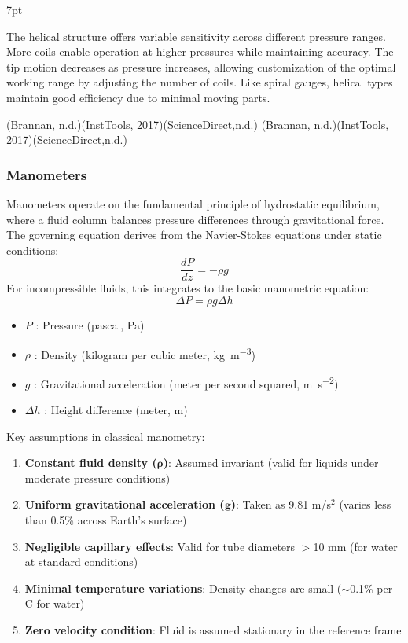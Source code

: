 \documentclass{article}
\newcommand{\formalsource}{} %
\newenvironment{formal}[3][]{%
	\renewcommand{\formalsource}{#1}%
	\def\FrameCommand{%
		\hspace{1pt}%
		{\color{#2}\vrule width 2pt}%
		{\color{#3}\vrule width 4pt}%
		\colorbox{#3}%
	}%
	\MakeFramed{\advance\hsize-\width\FrameRestore}%
	\noindent\hspace{-4.55pt}%
	\begin{adjustwidth}{}{7pt}%
		\vspace{2pt}%
	}%
	{%
		\vspace{4pt}%
		\ifx\formalsource\empty %
		\else
		\hfill{\footnotesize{\formalsource}}%
		\fi
	\end{adjustwidth}\endMakeFramed%
}
\newcommand{\wm}[2]{%
	\begin{minipage}{#1\textwidth}
		\centering
		#2
	\end{minipage}%
}
\begin{document}
\begin{formal}[(Brannan, n.d.)(InstTools, 2017)(ScienceDirect,n.d.)]{black!60!white}{white}
\begin{itemize}
	The helical structure offers variable sensitivity across different pressure ranges. More coils enable operation at higher pressures while maintaining accuracy. The tip motion decreases as pressure increases, allowing customization of the optimal working range by adjusting the number of coils. Like spiral gauges, helical types maintain good efficiency due to minimal moving parts.
\end{itemize}
\end{formal}

\vspace{1em}
\subsubsection{Manometers}	

Manometers operate on the fundamental principle of hydrostatic equilibrium, where a fluid column balances pressure differences through gravitational force. The governing equation derives from the Navier-Stokes equations under static conditions:
\begin{equation}
	\frac{dP}{dz} = -\rho g
\end{equation}
\noindent 
For incompressible fluids, this integrates to the basic manometric equation:
\begin{equation}
	\Delta P = \rho g \Delta h
	\label{pressure}
\end{equation}
\begin{center}
\hspace{10em}\wm{0.7}{\centering
	\begin{itemize}[itemsep=-1mm,leftmargin=0cm]
		\item $P$ : Pressure (pascal, \si{\Pa})  
		\item $\rho$ : Density (kilogram per cubic meter, \si{\kg\per\m\cubed})  
		\item $g$ : Gravitational acceleration (meter per second squared, \si{\m\per\s\squared})  
		\item $\Delta h$ : Height difference (meter, \si{\m})
	\end{itemize}}
\end{center}
Key assumptions in classical manometry:
\begin{enumerate}
	\item \textbf{Constant fluid density ($\bm{\rho}$)}: Assumed invariant (valid for liquids under moderate pressure conditions)
	\item \textbf{Uniform gravitational acceleration ($\bm{g}$)}: Taken as 9.81 m/s$^2$ (varies less than 0.5\% across Earth's surface)
	\item \textbf{Negligible capillary effects}: Valid for tube diameters $>$10 mm (for water at standard conditions)
	\item \textbf{Minimal temperature variations}: Density changes are small ($\sim$0.1\% per \textdegree C for water)
	\item \textbf{Zero velocity condition}: Fluid is assumed stationary in the reference frame
\end{enumerate}
\end{document}
